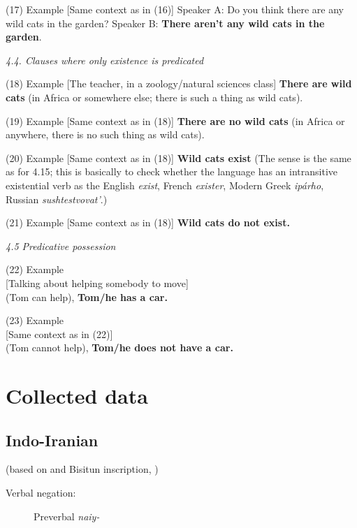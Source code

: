 \documentclass[output=paper,colorlinks,citecolor=brown]{langscibook}
\begin{document}
\begin{paperappendix}
\begin{unindented}
(17) Example
{}[Same context as in (16)] Speaker A: Do you think there are
any wild cats in the garden? Speaker B: \textbf{There aren’t any wild cats
in the garden}. 

\textit{4.4. Clauses where only existence is predicated} 

(18) Example [The teacher, in a zoology/natural sciences class]
\textbf{There are wild cats} (in Africa or somewhere else; there is such a
thing as wild cats). 

(19) Example [Same context as in (18)] \textbf{There are no
wild cats} (in Africa or anywhere, there is no such thing as wild cats). 

(20) Example [Same context as in (18)] \textbf{Wild cats exist} (The sense
is the same as for 4.15; this is basically to check whether the language
has an intransitive existential verb as the English \textit{exist}, French
\textit{exister}, Modern Greek \textit{ipárho}, Russian
\textit{sushtestvovat’}.) 

(21) Example [Same context as in (18)] \textbf{Wild cats do not exist.}

\textit{4.5 Predicative possession}

(22) Example\\
{}[Talking about helping somebody to move]\\
(Tom can help), \textbf{Tom/he has a car.}

(23) Example\\
{}[Same context as in (22)]\\
(Tom cannot help), \textbf{Tom/he does not have a car.}
\end{unindented}

\newpage
\section{Collected data}\label{AppendixB}%
\setcounter{equation}{0}
\setcounter{xnumi}{0}
\begin{unindented}
\subsection{Indo-Iranian}%

 (based on \citealt{Skjærvø2009a} and Bisitun inscription, \citealt{Schmitt1991})

\begin{description}
\item[Verbal negation:] Preverbal \textit{naiy-}


\end{description}
\end{unindented}
\end{paperappendix}
\end{document}
